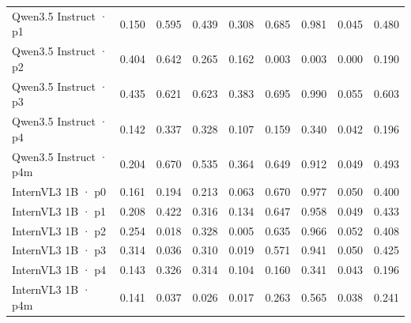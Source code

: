 \begin{tabular}{lrrrrrrrr}
Qwen3.5 Instruct · p1 & 0.150 & 0.595 & 0.439 & 0.308 & 0.685 & 0.981 & 0.045 & 0.480 \\
Qwen3.5 Instruct · p2 & 0.404 & 0.642 & 0.265 & 0.162 & 0.003 & 0.003 & 0.000 & 0.190 \\
Qwen3.5 Instruct · p3 & 0.435 & 0.621 & 0.623 & 0.383 & 0.695 & 0.990 & 0.055 & 0.603 \\
Qwen3.5 Instruct · p4 & 0.142 & 0.337 & 0.328 & 0.107 & 0.159 & 0.340 & 0.042 & 0.196 \\
Qwen3.5 Instruct · p4m & 0.204 & 0.670 & 0.535 & 0.364 & 0.649 & 0.912 & 0.049 & 0.493 \\
InternVL3 1B · p0 & 0.161 & 0.194 & 0.213 & 0.063 & 0.670 & 0.977 & 0.050 & 0.400 \\
InternVL3 1B · p1 & 0.208 & 0.422 & 0.316 & 0.134 & 0.647 & 0.958 & 0.049 & 0.433 \\
InternVL3 1B · p2 & 0.254 & 0.018 & 0.328 & 0.005 & 0.635 & 0.966 & 0.052 & 0.408 \\
InternVL3 1B · p3 & 0.314 & 0.036 & 0.310 & 0.019 & 0.571 & 0.941 & 0.050 & 0.425 \\
InternVL3 1B · p4 & 0.143 & 0.326 & 0.314 & 0.104 & 0.160 & 0.341 & 0.043 & 0.196 \\
InternVL3 1B · p4m & 0.141 & 0.037 & 0.026 & 0.017 & 0.263 & 0.565 & 0.038 & 0.241 \\
\bottomrule
\end{tabular}
